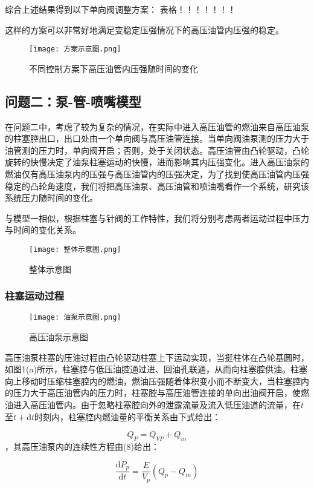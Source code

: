 \documentclass[withoutpreface,bwprint]{cumcmthesis} %
\begin{document}
			综合上述结果得到以下单向阀调整方案：
			表格！！！！！！！
			
			这样的方案可以非常好地满足变稳定压强情况下的高压油管内压强的稳定。
			\begin{figure}[!htbp]
				\centering
				\texttt{[image: 方案示意图.png]}
				\caption{不同控制方案下高压油管内压强随时间的变化}
			\end{figure}
			\subsection{问题二：泵-管-喷嘴模型}
			在问题二中，考虑了较为复杂的情况，在实际中进入高压油管的燃油来自高压油泵的柱塞腔出口，出口处由一个单向阀与高压油管连接。当单向阀油泵测的压力大于油管测的压力时，单向阀开启；否则，处于关闭状态。高压油管由凸轮驱动，凸轮旋转的快慢决定了油泵柱塞运动的快慢，进而影响其内压强变化。进入高压油泵的燃油仅有高压油泵内的压强与高压油管内的压强决定，为了找到使高压油管内压强稳定的凸轮角速度，我们将把高压油泵、高压油管和喷油嘴看作一个系统，研究该系统压力随时间的变化。
			
			与模型一相似，根据柱塞与针阀的工作特性，我们将分别考虑两者运动过程中压力与时间的变化关系。
			\begin{figure}[!htbp]
				\centering
				\texttt{[image: 整体示意图.png]}
				\caption{整体示意图}
			\end{figure}
			\subsubsection{柱塞运动过程}
			\begin{figure}[!htbp]
				\centering
				\texttt{[image: 油泵示意图.png]}
				\caption{高压油泵示意图}
			\end{figure}
			
			高压油泵柱塞的压油过程由凸轮驱动柱塞上下运动实现，当挺柱体在凸轮基圆时，如图1(a)所示，柱塞腔与低压油腔通过进、回油孔联通，从而向柱塞腔供油。柱塞向上移动时压缩柱塞腔内的燃油，燃油压强随着体积变小而不断变大，当柱塞腔内的压力大于高压油管内的压力时，柱塞腔与高压油管连接的单向出油阀开启，使燃油进入高压油管内。由于忽略柱塞腔向外的泄露流量及流入低压油道的流量，在$t$至$t + \mathrm{d}t$时刻内，柱塞腔内燃油量的平衡关系由下式给出：
			
			\begin{equation}Q_P = Q_{VP} + Q_{in}\end{equation}，其高压油泵内的连续性方程由(8)给出：
			
			\begin{equation}\frac{\mathrm{d}P_p}{\mathrm{d}t} = \frac{E}{V_p}(Q_{p} - Q_{in})\end{equation}
			
\end{document}
